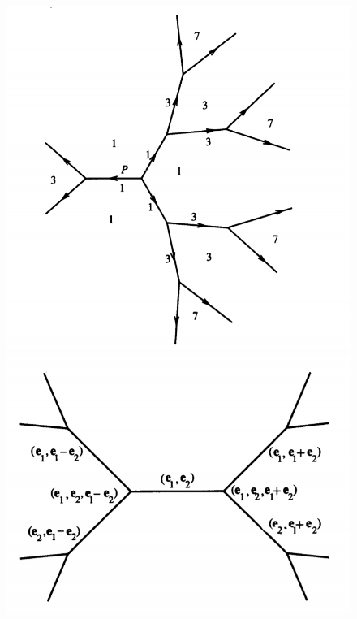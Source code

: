 \documentclass[14pt,fleqn]{article}
\begin{document}
 \begin{figure}[H]
  \centering
  \subfloat  
{\includegraphics[scale=.25]{tree3.png}  
}
 \hfill
  \subfloat
  {\includegraphics[scale=.25]{tree2.png}  
}

\end{figure}
\end{document}
